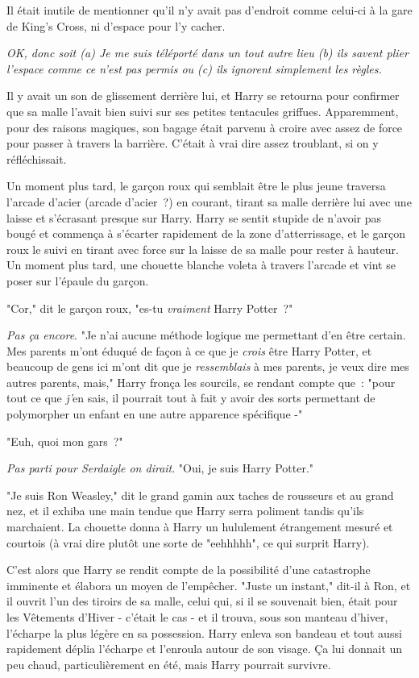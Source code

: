 Il était inutile de mentionner qu'il n'y avait pas d'endroit comme celui-ci à la gare de King's Cross, ni d'espace pour l'y cacher.

\emph{OK, donc soit (a) Je me suis téléporté dans un tout autre lieu (b) ils savent plier l'espace comme ce n'est pas permis ou (c) ils ignorent simplement les règles.}

Il y avait un son de glissement derrière lui, et Harry se retourna pour confirmer que sa malle l'avait bien suivi sur ses petites tentacules griffues. Apparemment, pour des raisons magiques, son bagage était parvenu à croire avec assez de force pour passer à travers la barrière. C'était à vrai dire assez troublant, si on y réfléchissait.

Un moment plus tard, le garçon roux qui semblait être le plus jeune traversa l'arcade d'acier (arcade d'acier~?) en courant, tirant sa malle derrière lui avec une laisse et s'écrasant presque sur Harry. Harry se sentit stupide de n'avoir pas bougé et commença à s'écarter rapidement de la zone d'atterrissage, et le garçon roux le suivi en tirant avec force sur la laisse de sa malle pour rester à hauteur. Un moment plus tard, une chouette blanche voleta à travers l'arcade et vint se poser sur l'épaule du garçon.

"Cor," dit le garçon roux, "es-tu \emph{vraiment} Harry Potter~?"

\emph{Pas ça encore}. "Je n'ai aucune méthode logique me permettant d'en être certain. Mes parents m'ont éduqué de façon à ce que je \emph{crois} être Harry Potter, et beaucoup de gens ici m'ont dit que je \emph{ressemblais} à mes parents, je veux dire mes autres parents, mais," Harry fronça les sourcils, se rendant compte que~: "pour tout ce que \emph{j'}en sais, il pourrait tout à fait y avoir des sorts permettant de polymorpher un enfant en une autre apparence spécifique -"

"Euh, quoi mon gars~?"

\emph{Pas parti pour Serdaigle on dirait}. "Oui, je suis Harry Potter."

"Je suis Ron Weasley," dit le grand gamin aux taches de rousseurs et au grand nez, et il exhiba une main tendue que Harry serra poliment tandis qu'ils marchaient. La chouette donna à Harry un hululement étrangement mesuré et courtois (à vrai dire plutôt une sorte de "eehhhhh", ce qui surprit Harry).

C'est alors que Harry se rendit compte de la possibilité d'une catastrophe imminente et élabora un moyen de l'empêcher. "Juste un instant," dit-il à Ron, et il ouvrit l'un des tiroirs de sa malle, celui qui, si il se souvenait bien, était pour les Vêtements d'Hiver - c'était le cas - et il trouva, sous son manteau d'hiver, l'écharpe la plus légère en sa possession. Harry enleva son bandeau et tout aussi rapidement déplia l'écharpe et l'enroula autour de son visage. Ça lui donnait un peu chaud, particulièrement en été, mais Harry pourrait survivre.

